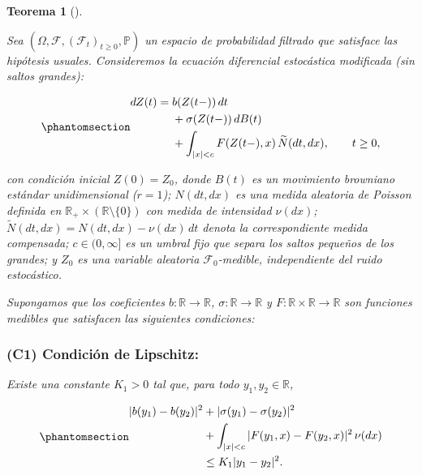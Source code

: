 \documentclass[
  spanish,
  us-letterpaper,
]{scrreprt}
\theoremstyle{plain}
\theoremstyle{plain}
\theoremstyle{definition}
\theoremstyle{plain}
\newtheorem{theorem}{Teorema}[chapter]
\theoremstyle{remark}
\begin{document}
\begin{theorem}[]\protect\hypertarget{thm-varmues}{}\label{thm-varmues}

Sea \((\Omega, \mathcal{F}, (\mathcal{F}_t)_{t \geq 0}, \mathbb{P})\) un
espacio de probabilidad filtrado que satisface las hipótesis usuales.
Consideremos la ecuación diferencial estocástica modificada (sin saltos
grandes):

\begin{equation}\phantomsection\label{eq-sde}{
\begin{aligned}
dZ(t) ={}& b(Z(t-)) \, dt \\
         &+ \sigma(Z(t-)) \, dB(t) \\
         &+ \int_{|x| < c} F(Z(t-), x) \, \widetilde{N}(dt, dx), \qquad t \geq 0,
\end{aligned}
}\end{equation}

con condición inicial \(Z(0) = Z_0\), donde \(B(t)\) es un movimiento
browniano estándar unidimensional (\(r=1\)); \(N(dt, dx)\) es una medida
aleatoria de Poisson definida en
\(\mathbb{R}_+ \times (\mathbb{R} \setminus \{0\})\) con medida de
intensidad \(\nu(dx)\);
\(\widetilde{N}(dt, dx) = N(dt, dx) - \nu(dx)\,dt\) denota la
correspondiente medida compensada; \(c \in (0, \infty]\) es un umbral
fijo que separa los saltos pequeños de los grandes; y \(Z_0\) es una
variable aleatoria \(\mathcal{F}_0\)-medible, independiente del ruido
estocástico.

Supongamos que los coeficientes \(b: \mathbb{R} \to \mathbb{R}\),
\(\sigma: \mathbb{R} \to \mathbb{R}\) y
\(F: \mathbb{R} \times \mathbb{R} \to \mathbb{R}\) son funciones
medibles que satisfacen las siguientes condiciones:

\subsubsection{(C1) Condición de
Lipschitz:}\label{c1-condiciuxf3n-de-lipschitz}

Existe una constante \(K_1 > 0\) tal que, para todo
\(y_1, y_2 \in \mathbb{R}\),

\begin{equation}\phantomsection\label{eq-lipschitz}{
\begin{aligned}
|b(y_1) - b(y_2)|^2 & + |\sigma(y_1) - \sigma(y_2)|^2\\ 
& + \int_{|x| < c} |F(y_1, x) - F(y_2, x)|^2 \, \nu(dx) \\
&\leq K_1 |y_1 - y_2|^2.
\end{aligned}
}\end{equation}


\end{theorem}
\end{document}

